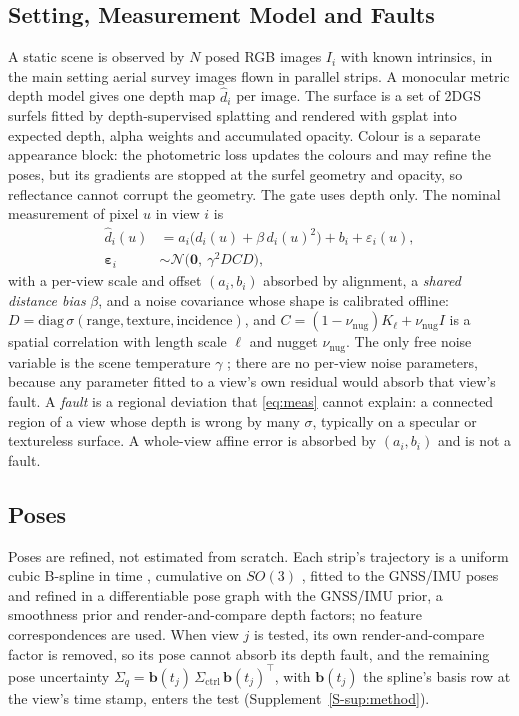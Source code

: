 \subsection{Setting, Measurement Model and Faults}
\label{sec:method:setting}
A static scene is observed by $N$ posed RGB images $I_i$ with known intrinsics, in the main setting aerial
survey images flown in parallel strips. A monocular metric depth model gives one depth map $\hat d_i$ per
image. The surface is a set of 2DGS surfels \cite{gs_2dgs} fitted by depth-supervised splatting and
rendered with gsplat \cite{gs_gsplat} into expected depth, alpha weights and accumulated opacity. Colour
is a separate appearance block: the photometric loss updates the colours and may refine the poses, but its
gradients are stopped at the surfel geometry and opacity, so reflectance cannot corrupt the geometry. The
gate uses depth only. The nominal measurement of pixel $u$ in view $i$ is
\begin{equation}
\begin{split}
  \hat d_i(u)&=a_i\bigl(d_i(u)+\beta\,d_i(u)^{2}\bigr)+b_i+\varepsilon_i(u),\\
  \boldsymbol\varepsilon_i&\sim\mathcal{N}\bigl(\mathbf{0},\ \gamma^{2}DCD\bigr),
\end{split}
  \label{eq:meas}
\end{equation}
with a per-view scale and offset $(a_i,b_i)$ absorbed by alignment, a \emph{shared distance bias} $\beta$,
and a noise covariance whose shape is calibrated offline:
$D=\mathrm{diag}\,\sigma(\text{range},\text{texture},\text{incidence})$, and
$C=(1-\nu_{\mathrm{nug}})K_\ell+\nu_{\mathrm{nug}}I$ is a spatial correlation with length scale $\ell$ and
nugget $\nu_{\mathrm{nug}}$. The only free noise variable is the scene temperature $\gamma$
\cite{cal_guo_temperature}; there are no per-view noise parameters, because any parameter fitted to a
view's own residual would absorb that view's fault. A \emph{fault} is a regional deviation that
\eqref{eq:meas} cannot explain: a connected region of a view whose depth is wrong by many $\sigma$,
typically on a specular or textureless surface. A whole-view affine error is absorbed by $(a_i,b_i)$ and
is not a fault.

\subsection{Poses}
\label{sec:method:poses}
Poses are refined, not estimated from scratch. Each strip's trajectory is a uniform cubic B-spline in time
\cite{traj_furgale_basis}, cumulative on $SO(3)$ \cite{traj_sommer_bspline}, fitted to the GNSS/IMU poses
and refined in a differentiable pose graph with the GNSS/IMU prior, a smoothness prior and
render-and-compare depth factors; no feature correspondences are used. When view $j$ is tested, its own
render-and-compare factor is removed, so its pose cannot absorb its depth fault, and the remaining pose
uncertainty $\Sigma_q=\mathbf{b}(t_j)\,\Sigma_{\mathrm{ctrl}}\,\mathbf{b}(t_j)^{\top}$, with
$\mathbf{b}(t_j)$ the spline's basis row at the view's time stamp, enters the test
(Supplement~\ref{S-sup:method}).

